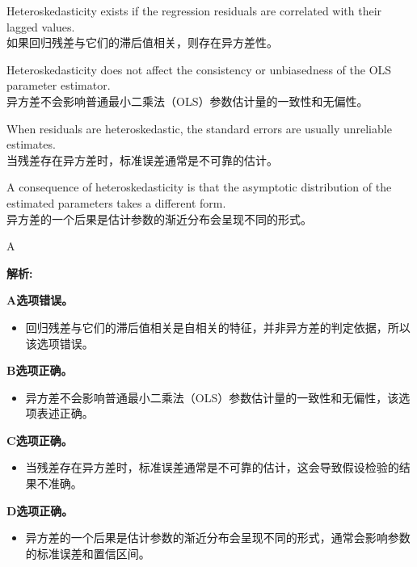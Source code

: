 \documentclass{article}
\newenvironment{explanation}
{\textbf{解析:}\par}
{\par}
\begin{document}
    \begin{choices}
        \item Heteroskedasticity exists if the regression residuals are correlated with their lagged values.\\
        如果回归残差与它们的滞后值相关，则存在异方差性。
        \item Heteroskedasticity does not affect the consistency or unbiasedness of the OLS parameter estimator.\\
        异方差不会影响普通最小二乘法（OLS）参数估计量的一致性和无偏性。
        \item When residuals are heteroskedastic, the standard errors are usually unreliable estimates.\\
        当残差存在异方差时，标准误差通常是不可靠的估计。
        \item A consequence of heteroskedasticity is that the asymptotic distribution of the estimated parameters takes a different form.\\
        异方差的一个后果是估计参数的渐近分布会呈现不同的形式。

    \end{choices}
    
    \begin{correctanswer}
    A
    \end{correctanswer}
    
    \begin{explanation}
    \textbf{A选项错误。}
    \begin{itemize}
    \item 回归残差与它们的滞后值相关是自相关的特征，并非异方差的判定依据，所以该选项错误。
    \end{itemize}
    \textbf{B选项正确。}
    \begin{itemize}
    \item 异方差不会影响普通最小二乘法（OLS）参数估计量的一致性和无偏性，该选项表述正确。
    \end{itemize}
    \textbf{C选项正确。}
    \begin{itemize}
        \item 当残差存在异方差时，标准误差通常是不可靠的估计，这会导致假设检验的结果不准确。
    \end{itemize}
    \textbf{D选项正确。}
    \begin{itemize}
        \item 异方差的一个后果是估计参数的渐近分布会呈现不同的形式，通常会影响参数的标准误差和置信区间。
    \end{itemize}
    \end{explanation}
    
\end{document}
